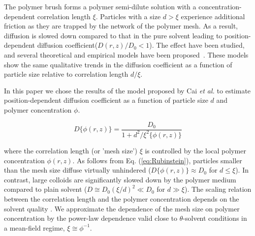\documentclass[12pt, a4paper]{article}
\begin{document}

The polymer brush forms a polymer semi-dilute solution with a concentration-dependent correlation length $\xi$.
Particles with a size $d > \xi$ experience additional friction as they are trapped by the network of the polymer mesh.
As a result, diffusion is slowed down compared to that in the pure solvent leading to position-dependent diffusion coefficient($D(r,z)/D_0 < 1$).
The effect have been studied, and several theoretical and empirical models have been proposed~\cite{Kohli2012,Cai2011,Holyst2009,Phillies1988}.
These models show the same qualitative trends in the diffusion coefficient as a function of particle size relative to  correlation length $d / \xi$.


In this paper we chose the results of the model proposed by Cai \emph{et al.} \cite{Cai2011} to estimate position-dependent diffusion coefficient as a function of particle size $d$ and polymer concentration $\phi$.

\begin{equation}
    D\{\phi(r,z)\} = \frac{D_0}{1+d^2/\xi^{2}\{\phi(r,z)\}}
    \label{eq:Rubinstein}
\end{equation}

\noindent where the correlation length (or 'mesh size') $\xi$ is controlled by the local polymer concentration $\phi(r,z)$. 
As follows from Eq. (\ref{eq:Rubinstein}), particles smaller than the mesh size diffuse virtually unhindered ($D\{\phi(r,z)\}\approx D_0$ for $d\leq \xi$). 
In contrast, large colloids are significantly slowed down by the polymer medium compared to plain solvent ($D\cong D_0 (\xi/d)^2\ll D_0$ for $d\gg \xi$). 
The scaling relation between the correlation length and the polymer concentration depends on the solvent quality \cite{DeGennes1979}.
We approximate the dependence of the mesh size on polymer concentration by the power-law dependence valid close to $\theta$-solvent conditions in a mean-field regime, $\xi\cong \phi^{-1}$. 
\end{document}
